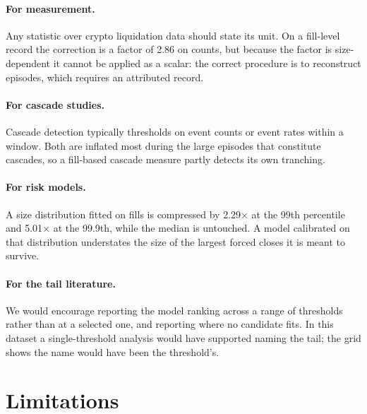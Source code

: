 \documentclass[11pt,a4paper]{article}
\begin{document}
\paragraph{For measurement.} Any statistic over crypto liquidation data should state its unit.
On a fill-level record the correction is a factor of 2.86 on counts, but because the factor is
size-dependent it cannot be applied as a scalar: the correct procedure is to reconstruct
episodes, which requires an attributed record.

\paragraph{For cascade studies.} Cascade detection typically thresholds on event counts or
event rates within a window. Both are inflated most during the large episodes that constitute
cascades, so a fill-based cascade measure partly detects its own tranching.

\paragraph{For risk models.} A size distribution fitted on fills is compressed by 2.29$\times$ at
the 99th percentile and 5.01$\times$ at the 99.9th, while the median is untouched. A model calibrated on that distribution
understates the size of the largest forced closes it is meant to survive.

\paragraph{For the tail literature.} We would encourage reporting the model ranking across a
range of thresholds rather than at a selected one, and reporting where no candidate fits. In this
dataset a single-threshold analysis would have supported naming the tail; the grid shows the
name would have been the threshold's.

\section{Limitations}
\label{sec:limits}
\end{document}
